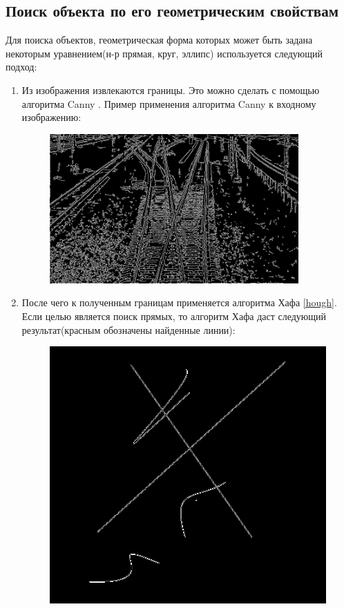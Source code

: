 \subsection{Поиск объекта по его геометрическим свойствам}
Для поиска объектов, геометрическая форма которых может быть задана некоторым уравнением(н-р прямая, круг, эллипс) используется следующий подход:
\begin{enumerate}
	\item Из изображения извлекаются границы. Это можно сделать с помощью алгоритма Canny \cite{b:canny}. \newline
	Пример применения алгоритма Canny к входному изображению:
	\begin{figure}[!h]
		\centering
		\includegraphics[width=0.9\textwidth]{pictures/canny_res}
		\caption[Применение алгоритма Canny]{}
		\label{fig:cannyres}
	\end{figure}
	\item После чего к полученным границам применяется алгоритма Хафа \ref{hough}. Если целью является поиск прямых, то алгоритм Хафа даст следующий результат(красным обозначены найденные линии):
	\begin{figure}[!h]
		\centering
		\begin{minipage}{0.45\textwidth}
			\centering
			\includegraphics[width=0.7\linewidth]{pictures/canny_ex}

\end{minipage}
\end{figure}
\end{enumerate}
